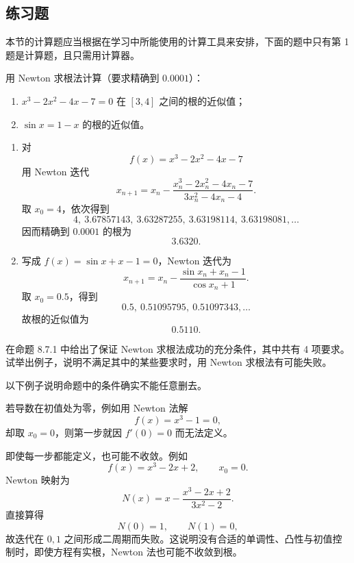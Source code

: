 \subsection{练习题}

本节的计算题应当根据在学习中所能使用的计算工具来安排，下面的题中只有第 1 题是计算题，且只需用计算器。

\begin{xexercise}[1]
用 Newton 求根法计算（要求精确到 $0.0001$）：
  \begin{enumerate}[label=(\arabic*)]
    \item $x^3-2x^2-4x-7=0$ 在 $[3,4]$ 之间的根的近似值；
    \item $\sin x=1-x$ 的根的近似值。
  \end{enumerate}
\end{xexercise}
\begin{xsolution}
\begin{enumerate}[label=(\arabic*)]
  \item 对
  \[
    f(x)=x^3-2x^2-4x-7
  \]
  用 Newton 迭代
  \[
    x_{n+1}=x_n-\frac{x_n^3-2x_n^2-4x_n-7}{3x_n^2-4x_n-4}.
  \]
  取 $x_0=4$，依次得到
  \[
    4,\ 3.67857143,\ 3.63287255,\ 3.63198114,\ 3.63198081,\ldots
  \]
  因而精确到 $0.0001$ 的根为
  \[
    \boxed{3.6320}.
  \]

  \item 写成 $f(x)=\sin x+x-1=0$，Newton 迭代为
  \[
    x_{n+1}=x_n-\frac{\sin x_n+x_n-1}{\cos x_n+1}.
  \]
  取 $x_0=0.5$，得到
  \[
    0.5,\ 0.51095795,\ 0.51097343,\ldots
  \]
  故根的近似值为
  \[
    \boxed{0.5110}.
  \]
\end{enumerate}
\end{xsolution}


\begin{xexercise}[2]
在命题 8.7.1 中给出了保证 Newton 求根法成功的充分条件，其中共有 4 项要求。试举出例子，说明不满足其中的某些要求时，用 Newton 求根法有可能失败。
\end{xexercise}
\begin{xsolution}
以下例子说明命题中的条件确实不能任意删去。

若导数在初值处为零，例如用 Newton 法解
\[
  f(x)=x^3-1=0,
\]
却取 $x_0=0$，则第一步就因 $f'(0)=0$ 而无法定义。

即使每一步都能定义，也可能不收敛。例如
\[
  f(x)=x^3-2x+2,\qquad x_0=0.
\]
Newton 映射为
\[
  N(x)=x-\frac{x^3-2x+2}{3x^2-2}.
\]
直接算得
\[
  N(0)=1,\qquad N(1)=0,
\]
故迭代在 $0,1$ 之间形成二周期而失败。这说明没有合适的单调性、凸性与初值控制时，即使方程有实根，Newton 法也可能不收敛到根。
\end{xsolution}


